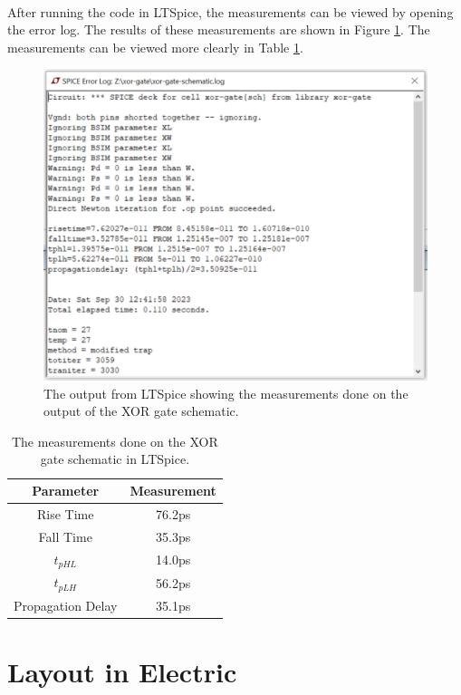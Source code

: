 \documentclass{article}
\begin{document}
  \paragraph{}
  After running the code in LTSpice, the measurements can be viewed by opening the error log. The results of these measurements are shown in Figure \ref{fig:meas-sch}. The measurements can be viewed more clearly in Table \ref{table:meas-sch}.

  \begin{figure}[H]
    \centering
    \includegraphics[width=0.7\linewidth, frame]{screenshots/meas-schematic.png}
    \caption{The output from LTSpice showing the measurements done on the output of the XOR gate schematic.}
    \label{fig:meas-sch}
  \end{figure}


  \begin{table}[H]
    \centering
    \footnotesize
    \begin{tabular}{|c|c|}
      \hline
      \textbf{Parameter} & \textbf{Measurement} \\
      \hline
      Rise Time & 76.2ps\\
      \hline
      Fall Time & 35.3ps \\
      \hline
      $t_{pHL}$ & 14.0ps \\
      \hline
      $t_{pLH}$ & 56.2ps \\
      \hline
      Propagation Delay & 35.1ps \\
      \hline
    \end{tabular}
    \caption{The measurements done on the XOR gate schematic in LTSpice.}
    \label{table:meas-sch}
  \end{table}


\section{Layout in Electric}
\end{document}
